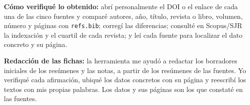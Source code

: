 \documentclass[11pt,a4paper]{article}
\begin{document}
	\textbf{C\'omo verifiqu\'e lo obtenido:} abr\'i personalmente el DOI o el enlace de cada una de las
	cinco fuentes y compar\'e autores, a\~no, t\'itulo, revista o libro, volumen, n\'umero y p\'aginas con
	\texttt{refs.bib}; correg\'i las diferencias; consult\'e en Scopus/SJR la indexaci\'on y el
	cuartil de cada revista; y le\'i cada fuente para localizar el dato concreto y su p\'agina.
	
	\textbf{Redacci\'on de las fichas:} la herramienta me ayud\'o a redactar los borradores iniciales de los res\'umenes y
	las notas, a partir de los res\'umenes de las fuentes. Yo verifiqu\'e cada afirmaci\'on, ubiqu\'e los datos concretos con su p\'agina y reescrib\'i los textos con
	mis propias palabras. Los datos y sus p\'aginas son los que constat\'e en las fuentes.
	
\end{document}
